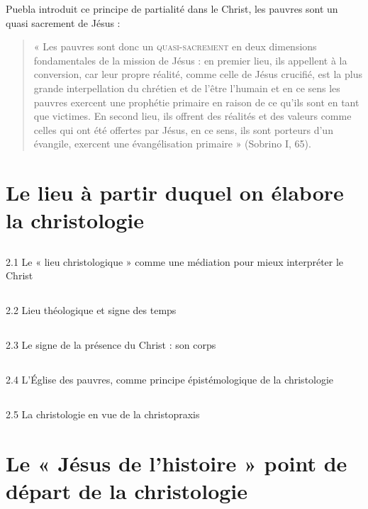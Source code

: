 Puebla introduit ce principe de partialité dans le Christ, les pauvres sont un quasi sacrement de Jésus : 

\begin{quote}
    « Les pauvres sont donc un \textsc{quasi-sacrement} en deux dimensions fondamentales de la mission de
Jésus : en premier lieu, ils appellent à la conversion, car leur propre réalité, comme celle de Jésus
crucifié, est la plus grande interpellation du chrétien et de l’être l’humain et en ce sens les pauvres
exercent une prophétie primaire en raison de ce qu’ils sont en tant que victimes.
En second lieu, ils offrent des réalités et des valeurs comme celles qui ont été offertes par Jésus, en ce
sens, ils sont porteurs d’un évangile, exercent une évangélisation primaire » (Sobrino I, 65).
\end{quote}

\section{Le lieu à partir duquel on élabore la christologie}

\subsection{}
2.1 Le « lieu christologique » comme une médiation pour mieux interpréter le Christ

\subsection{}
2.2 Lieu théologique et signe des temps

\subsection{}
2.3 Le signe de la présence du Christ : son corps

\subsection{}
2.4 L’Église des pauvres, comme principe épistémologique de la christologie

\subsection{}
2.5 La christologie en vue de la christopraxis


 \section{Le « Jésus de l’histoire » point de départ de la christologie}


